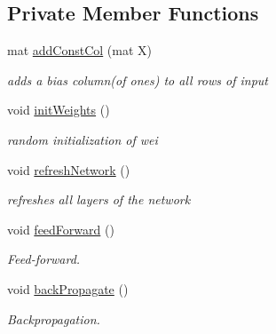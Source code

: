 \subsection*{Private Member Functions}
\begin{DoxyCompactItemize}
\item 
\mbox{\label{classNeuralNetwork_a588b6c78bde22fed1435ca9c599f64cf}} 
mat \hyperlink{classNeuralNetwork_a588b6c78bde22fed1435ca9c599f64cf}{add\+Const\+Col} (mat X)
\begin{DoxyCompactList}\small\item\em adds a bias column(of ones) to all rows of input \end{DoxyCompactList}\item 
\mbox{\label{classNeuralNetwork_a6ea041b895ae869eadadfa1ab0d22338}} 
void \hyperlink{classNeuralNetwork_a6ea041b895ae869eadadfa1ab0d22338}{init\+Weights} ()
\begin{DoxyCompactList}\small\item\em random initialization of wei \end{DoxyCompactList}\item 
\mbox{\label{classNeuralNetwork_ad3a5dc5714a1d13fd03248c358b4200e}} 
void \hyperlink{classNeuralNetwork_ad3a5dc5714a1d13fd03248c358b4200e}{refresh\+Network} ()
\begin{DoxyCompactList}\small\item\em refreshes all layers of the network \end{DoxyCompactList}\item 
\mbox{\label{classNeuralNetwork_ab61fc301b2587012e3f8bd1e8a244d30}} 
void \hyperlink{classNeuralNetwork_ab61fc301b2587012e3f8bd1e8a244d30}{feed\+Forward} ()
\begin{DoxyCompactList}\small\item\em Feed-\/forward. \end{DoxyCompactList}\item 
\mbox{\label{classNeuralNetwork_a74fbc6e9431722bd5f9d9795b41cf105}} 
void \hyperlink{classNeuralNetwork_a74fbc6e9431722bd5f9d9795b41cf105}{back\+Propagate} ()
\begin{DoxyCompactList}\small\item\em Backpropagation. \end{DoxyCompactList}\end{DoxyCompactItemize}
